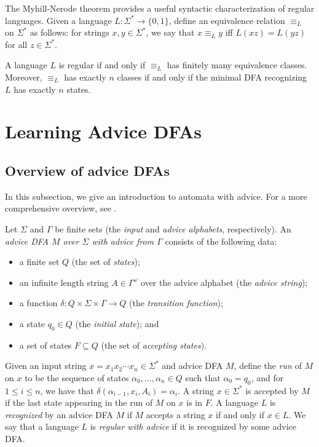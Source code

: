 \documentclass[runningheads]{llncs}
\begin{document}
The Myhill-Nerode theorem provides a useful syntactic characterization of regular languages.
Given a language $L : \Sigma^* \to \{0,1\}$, define an equivalence relation $\equiv_L$ on $\Sigma^*$ as follows: for strings $x,y \in \Sigma^*$, we say that $x \equiv_L y$ iff $L(xz)= L(yz)$ for all $z \in \Sigma^*$.

\begin{theorem} \label{thm:myhill-nerode}
  A language $L$ is regular if and only if $\equiv_L$ has finitely many equivalence classes.
  Moreover, $\equiv_L$ has exactly $n$ classes if and only if the minimal DFA recognizing $L$ has exactly $n$ states.
\end{theorem}


\section{Learning Advice DFAs} \label{section:complexity of advice DFAs}

\subsection{Overview of advice DFAs}

In this subsection, we give an introduction to automata with advice.
For a more comprehensive overview, see \cite{kruckman-etal:myhill-nerode-automata-advice}.

\begin{definition}
  Let $\Sigma$ and $\Gamma$ be finite sets (the \emph{input} and \emph{advice alphabets}, respectively). 
  An \emph{advice DFA $M$ over $\Sigma$ with advice from $\Gamma$} consists of the following data: 
  \begin{itemize}
        \item a finite set $Q$ (the set of \emph{states}); 
        \item an infinite length string $A \in \Gamma^\omega$ over the advice alphabet (the \emph{advice string}); 
        \item a function $\delta : Q \times \Sigma \times \Gamma \to Q$ (the \emph{transition function});
        \item a state $q_0 \in Q$  (the \emph{initial state}); and
        \item a set of states $F \subseteq Q$  (the set of \emph{accepting states}).
  \end{itemize}
\end{definition}

Given an input string $x = x_1 x_2 \cdots x_n \in \Sigma^*$ and advice DFA $M$, define the \emph{run} of $M$ on $x$ to be the sequence of states $\alpha_0, \ldots, \alpha_n \in Q$ such that $\alpha_0 = q_0$, and for $1 \leq i \leq n$, we have that $\delta(\alpha_{i-1}, x_i, A_i) = \alpha_i$. 
A string $x \in \Sigma^*$ is accepted by $M$ if the last state appearing in the run of $M$ on $x$ is in $F$.
A language $L$ is \emph{recognized} by an advice DFA $M$ if $M$ accepts a string $x$ if and only if $x \in L$.
We say that a language $L$ is \emph{regular with advice} if it is recognized by some advice DFA.
\end{document}
